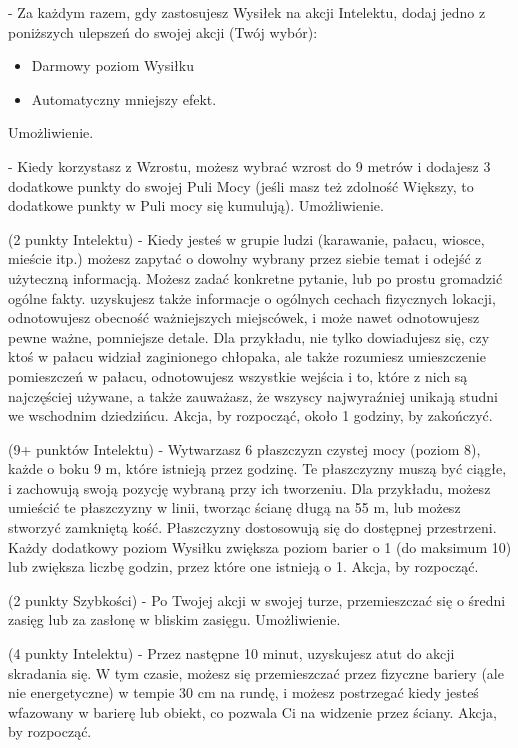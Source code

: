 { - Za każdym razem, gdy zastosujesz Wysiłek na akcji Intelektu, dodaj jedno z poniższych ulepszeń do swojej akcji (Twój wybór):
\begin{itemize}
	\item Darmowy poziom Wysiłku
	\item Automatyczny mniejszy efekt.
\end{itemize}
Umożliwienie.

 - Kiedy korzystasz z Wzrostu, możesz wybrać wzrost do 9 metrów i dodajesz 3 dodatkowe punkty do swojej Puli Mocy (jeśli masz też zdolność Większy, to dodatkowe punkty w Puli mocy się kumulują). Umożliwienie.

 (2 punkty Intelektu) - Kiedy jesteś w grupie ludzi (karawanie, pałacu, wiosce, mieście itp.) możesz zapytać o dowolny wybrany przez siebie temat i odejść z użyteczną informacją. Możesz zadać konkretne pytanie, lub po prostu gromadzić ogólne fakty. uzyskujesz także informacje o ogólnych cechach fizycznych lokacji, odnotowujesz obecność ważniejszych miejscówek, i może nawet odnotowujesz pewne ważne, pomniejsze detale. Dla przykładu, nie tylko dowiadujesz się, czy ktoś w pałacu widział zaginionego chłopaka, ale także rozumiesz umieszczenie pomieszczeń w pałacu, odnotowujesz wszystkie wejścia i to, które z nich są najczęściej używane, a także zauważasz, że wszyscy najwyraźniej unikają studni we wschodnim dziedzińcu.  Akcja, by rozpocząć, około 1 godziny, by zakończyć.

 (9+ punktów Intelektu) - Wytwarzasz 6 płaszczyzn czystej mocy (poziom 8), każde o boku 9 m, które istnieją przez godzinę. Te płaszczyzny muszą być ciągłe, i zachowują swoją pozycję wybraną przy ich tworzeniu. Dla przykładu, możesz umieścić te płaszczyzny w linii, tworząc ścianę długą na 55 m, lub możesz stworzyć zamkniętą kość. Płaszczyzny dostosowują się do dostępnej przestrzeni. Każdy dodatkowy poziom Wysiłku zwiększa poziom barier o 1 (do maksimum 10) lub zwiększa liczbę godzin, przez które one istnieją o 1. Akcja, by rozpocząć.

 (2 punkty Szybkości) - Po Twojej akcji w swojej turze, przemieszczać się o średni zasięg lub za zasłonę w bliskim zasięgu. Umożliwienie. 

 (4 punkty Intelektu) - Przez następne 10 minut, uzyskujesz atut do akcji skradania się. W tym czasie, możesz się przemieszczać przez fizyczne bariery (ale nie energetyczne) w tempie 30 cm na rundę, i możesz postrzegać kiedy jesteś wfazowany w barierę lub obiekt, co pozwala Ci na widzenie przez ściany. Akcja, by rozpocząć. 

}
